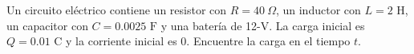 \item Un circuito eléctrico contiene un resistor con $R = 40 \ \Omega$, un inductor con $L = 2 \text{ H}$, un capacitor con $C = 0.0025 \text{ F}$ y una batería de 12-V. La carga inicial es $Q = 0.01 \text{ C}$ y la corriente inicial es $0$. Encuentre la carga en el tiempo $t$.
